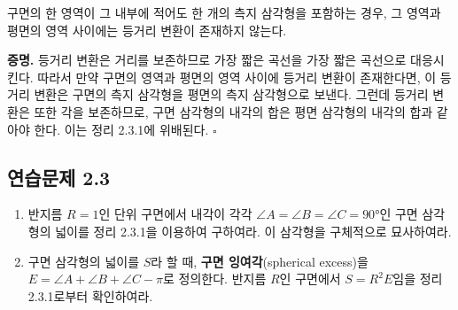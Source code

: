 \documentclass{article}
\begin{document}
\begin{tcolorbox}[
  colback=red!4, colframe=red!60!black,
  title=따름정리 2.3.1,
  fonttitle=\bfseries, boxrule=0.5mm, arc=3mm]

구면의 한 영역이 그 내부에 적어도 한 개의 측지 삼각형을 포함하는 경우,
그 영역과 평면의 영역 사이에는 등거리 변환이 존재하지 않는다.

\end{tcolorbox}

\textbf{증명.}\quad
등거리 변환은 거리를 보존하므로 가장 짧은 곡선을 가장 짧은 곡선으로 대응시킨다.
따라서 만약 구면의 영역과 평면의 영역 사이에 등거리 변환이 존재한다면,
이 등거리 변환은 구면의 측지 삼각형을 평면의 측지 삼각형으로 보낸다.
그런데 등거리 변환은 또한 각을 보존하므로,
구면 삼각형의 내각의 합은 평면 삼각형의 내각의 합과 같아야 한다.
이는 정리 2.3.1에 위배된다. \hfill $\square$

\subsection*{연습문제 2.3}

\begin{enumerate}
  \item 반지름 $R = 1$인 단위 구면에서 내각이 각각
    $\angle A = \angle B = \angle C = 90°$인 구면 삼각형의 넓이를 정리 2.3.1을 이용하여 구하여라.
    이 삼각형을 구체적으로 묘사하여라.

  \item 구면 삼각형의 넓이를 $S$라 할 때, \textbf{구면 잉여각}(spherical excess)을 $E = \angle A + \angle B + \angle C - \pi$로 정의한다.
    반지름 $R$인 구면에서 $S = R^2 E$임을 정리 2.3.1로부터 확인하여라.
\end{enumerate}
\end{document}

